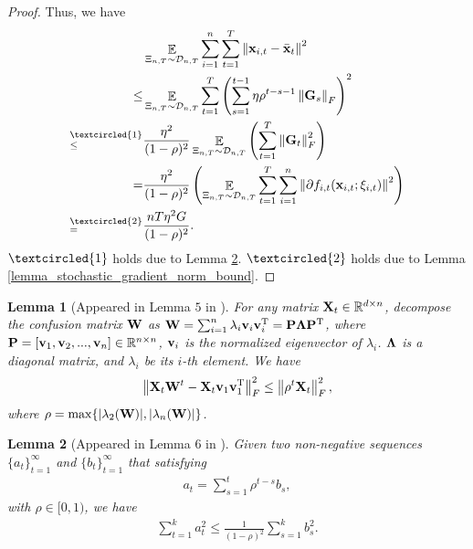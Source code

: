 \documentclass{article}
\newtheorem{Lemma}{\bf{Lemma}}
\begin{document}
\begin{proof}
Thus, we  have
\begin{align}
\nonumber
& \EE_{ \Xi_{n,T} \sim \Dcal_{n,T} } \sum_{i=1}^n\sum_{t=1}^T \lrnorm{\x_{i,t} - \bar{\x}_t}^2  \\ \nonumber 
\le & \EE_{ \Xi_{n,T} \sim \Dcal_{n,T} } \sum_{t=1}^T \lrincir{ \sum_{s=1}^{t-1} \eta \rho^{t-s-1} \lrnorm{\G_s}_F}^2  \\ \nonumber
\refabovecir{\le}{\textcircled{1}} & \frac{\eta^2}{(1-\rho)^2} \EE_{ \Xi_{n,T} \sim \Dcal_{n,T} } \lrincir{  \sum_{t=1}^T \lrnorm{\G_t}_F^2 } \\ \nonumber
= & \frac{\eta^2}{(1-\rho)^2} \lrincir{ \EE_{ \Xi_{n,T} \sim \Dcal_{n,T} } \sum_{t=1}^T \sum_{i=1}^n  \lrnorm{\partial f_{i,t}(\x_{i,t}; \xi_{i,t})}^2 } \\ \nonumber
\refabovecir{=}{\textcircled{2}} & \frac{nT\eta^2 G }{(1-\rho)^2}.
\end{align} $\textcircled{1}$ holds due to Lemma \ref{lemma_hanlin_2}.  $\textcircled{2}$ holds due to Lemma \ref{lemma_stochastic_gradient_norm_bound}.



\end{proof}








\begin{Lemma}[Appeared in Lemma $5$ in \citep{Tang:2018un}]
\label{lemma_hanlin_1}
For any matrix ${\bf X}_t\in\mathbb{R}^{d\times n}$, decompose the confusion matrix ${\bf W}$ as ${\bf W} = \sum_{i=1}^n \lambda_i {\bf v}_i {\bf v}_i^{\rm T} = {\bf P} \mathbf{\Lambda} {\bf P}^{\rm T}$, where ${\bf P} = [{\bf v}_1, {\bf v}_2, ..., {\bf v}_n]\in\mathbb{R}^{n\times n}$, ${\bf v}_i$ is the normalized eigenvector of $\lambda_i$. $\mathbf{\Lambda}$ is a diagonal matrix, and $\lambda_i$ be its $i$-th element. We have
\begin{align}
\nonumber
\left\lVert{\bf X}_t {\bf W}^t - {\bf X}_t {\bf v}_1 {\bf v}_1^{\rm T} \right\rVert_F^2 \le \left\lVert\rho^t {\bf X}_t\right\rVert_F^2, 
\end{align} where  $\rho = \max \{| \lambda_2({\bf W}) |, | \lambda_n({\bf W}) |\}$. 

\end{Lemma}


\begin{Lemma}[Appeared in Lemma $6$ in \citep{Tang:2018un}]
\label{lemma_hanlin_2}
Given two non-negative sequences $\{a_t\}_{t=1}^{\infty}$ and $\{b_t\}_{t=1}^{\infty}$ that satisfying
\begin{align}
\nonumber
a_t = \sum_{s=1}^t \rho^{t-s} b_s,
\end{align} with $\rho \in [0,1)$, we have
\begin{align}
\nonumber
\sum_{t=1}^k a_t^2 \le \frac{1}{(1-\rho)^2}\sum_{s=1}^k b_s^2.
\end{align}
\end{Lemma}
\end{document}
